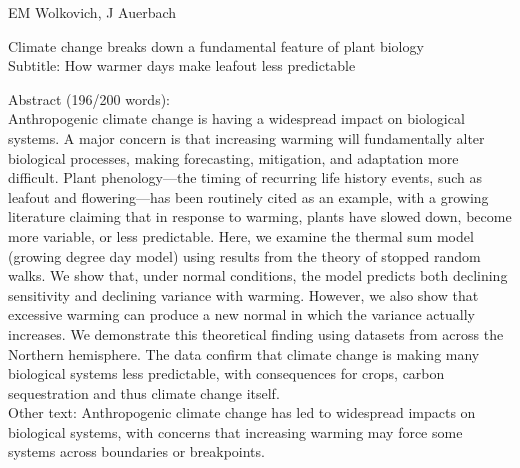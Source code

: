 \documentclass[11pt]{article}
\begin{document}
\renewcommand{\refname}{\CHead{}}

EM Wolkovich, J Auerbach 

Climate change breaks down a fundamental feature of plant biology\\
Subtitle: How warmer days make leafout less predictable %

Abstract (196/200 words): \\
Anthropogenic climate change is having a widespread impact on biological systems. A major concern is that increasing warming will fundamentally alter biological processes, making forecasting, mitigation, and adaptation more difficult. Plant phenology—the timing of recurring life history events, such as leafout and flowering—has been routinely cited as an example, with a growing literature claiming that in response to warming, plants have slowed down, become more variable, or less predictable. Here, we examine the thermal sum model (growing degree day model) using results from the theory of stopped random walks. We show that, under normal conditions, the model predicts both declining sensitivity and declining variance with warming. However, we also show that excessive warming can produce a new normal in which the variance actually increases. We demonstrate this theoretical finding using datasets from across the Northern hemisphere. The data confirm that climate change is making many biological systems less predictable, with consequences for crops, carbon sequestration and thus climate change itself. \\



Other text: 
Anthropogenic climate change has led to widespread impacts on biological systems, with concerns that increasing warming may force some systems across boundaries or breakpoints. 
\end{document}
